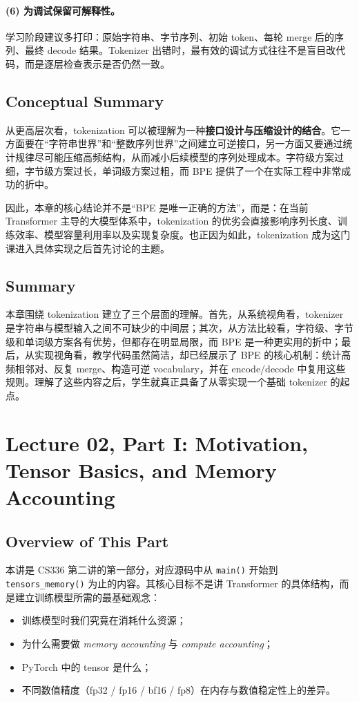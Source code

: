 \documentclass[a4paper,UTF8]{article}
\numberwithin{equation}{section}
\begin{document}
\paragraph{(6) 为调试保留可解释性。}
学习阶段建议多打印：原始字符串、字节序列、初始 token、每轮 merge 后的序列、最终 decode 结果。Tokenizer 出错时，最有效的调试方式往往不是盲目改代码，而是逐层检查表示是否仍然一致。

\subsection{Conceptual Summary}

从更高层次看，tokenization 可以被理解为一种\textbf{接口设计与压缩设计的结合}。它一方面要在“字符串世界”和“整数序列世界”之间建立可逆接口，另一方面又要通过统计规律尽可能压缩高频结构，从而减小后续模型的序列处理成本。字符级方案过细，字节级方案过长，单词级方案过粗，而 BPE 提供了一个在实际工程中非常成功的折中。

因此，本章的核心结论并不是“BPE 是唯一正确的方法”，而是：在当前 Transformer 主导的大模型体系中，tokenization 的优劣会直接影响序列长度、训练效率、模型容量利用率以及实现复杂度。也正因为如此，tokenization 成为这门课进入具体实现之后首先讨论的主题。

\subsection{Summary}

本章围绕 tokenization 建立了三个层面的理解。首先，从系统视角看，tokenizer 是字符串与模型输入之间不可缺少的中间层；其次，从方法比较看，字符级、字节级和单词级方案各有优势，但都存在明显局限，而 BPE 是一种更实用的折中；最后，从实现视角看，教学代码虽然简洁，却已经展示了 BPE 的核心机制：统计高频相邻对、反复 merge、构造可逆 vocabulary，并在 encode/decode 中复用这些规则。理解了这些内容之后，学生就真正具备了从零实现一个基础 tokenizer 的起点。


\section{Lecture 02, Part I: Motivation, Tensor Basics, and Memory Accounting}

\subsection{Overview of This Part}

本讲是 CS336 第二讲的第一部分，对应源码中从 \verb|main()| 开始到 \verb|tensors_memory()| 为止的内容。其核心目标不是讲 Transformer 的具体结构，而是建立训练模型所需的最基础观念：
\begin{itemize}
    \item 训练模型时我们究竟在消耗什么资源；
    \item 为什么需要做 \emph{memory accounting} 与 \emph{compute accounting}；
    \item PyTorch 中的 tensor 是什么；
    \item 不同数值精度（fp32 / fp16 / bf16 / fp8）在内存与数值稳定性上的差异。
\end{itemize}
\end{document}
